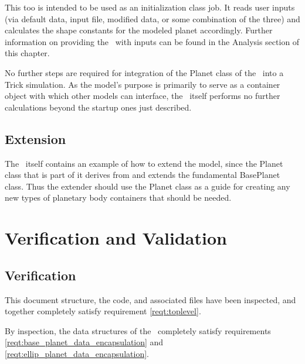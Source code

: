 This too is intended to be used as an initialization class job. It reads user
inputs (via default data, input file, modified data, or some combination of the
three) and calculates the shape constants for the modeled planet accordingly.
Further information on providing the \planetDesc\ with inputs can be found in
the Analysis section of this chapter.

No further steps are required for integration of the Planet class of the
\planetDesc\ into a Trick simulation.  As the model's purpose is primarily to
serve as a container object with which other models can interface, the
\planetDesc\ itself performs no further calculations beyond the startup ones
just described.


\section{Extension}

The \planetDesc\ itself contains an example of how to extend the model, since
the Planet class that is part of it derives from and extends the fundamental
BasePlanet class. Thus the extender should use the Planet class as a guide for
creating any new types of planetary body containers that should be needed.



\chapter{Verification and Validation}\label{ch:ivv}

\section{Verification}

\label{inspect:TLI}
This document structure, the code, and associated files have been inspected,
and together completely satisfy requirement \ref{reqt:toplevel}.

\label{inspect:data_reqts}
By inspection, the data structures of the \planetDesc\ completely satisfy
requirements \ref{reqt:base_planet_data_encapsulation} and
\ref{reqt:ellip_planet_data_encapsulation}.

